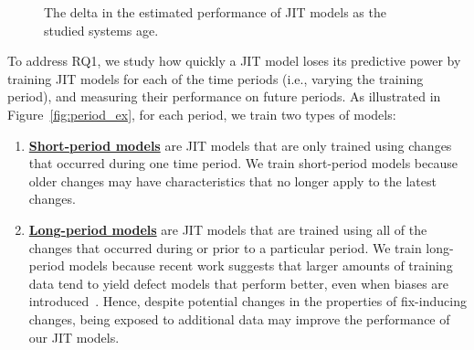 \begin{figure}[t]
  \centering
  \qquad
  \qquad
  \qquad
  \caption{The delta in the estimated performance of JIT models as the studied systems age.}
  \label{fig:perf_delta}
\end{figure}

To address RQ1, we study how quickly a JIT model loses its predictive power by training JIT models for each of the time periods (i.e., varying the training period), and measuring their performance on future periods.
As illustrated in Figure~\ref{fig:period_ex}, for each period, we train two types of models:

\begin{enumerate}
  \item \underline{\bf Short-period models} are JIT models that are only trained using changes that occurred during one time period.
    We train short-period models because older changes may have characteristics that no longer apply to the latest changes.
  \item \underline{\bf Long-period models} are JIT models that are trained using all of the changes that occurred during or prior to a particular period.
    We train long-period models because recent work suggests that larger amounts of training data tend to yield defect models that perform better, even when biases are introduced~\cite{rahman2013fse}.
    Hence, despite potential changes in the properties of fix-inducing changes, being exposed to additional data may improve the performance of our JIT models.
\end{enumerate}

